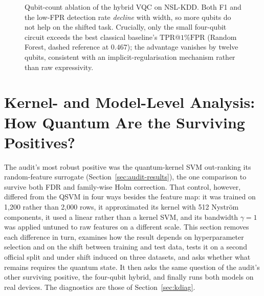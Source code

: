 \documentclass[preprint,11pt]{elsarticle}
\newcommand{\tpr}{\mathrm{TPR}}
\newcommand{\fpr}{\mathrm{FPR}}
\begin{document}
\begin{figure}[t]
\centering
{}
\caption{Qubit-count ablation of the hybrid VQC on NSL-KDD. Both F1 and the low-FPR detection rate
\emph{decline} with width, so more qubits do not help on the shifted task. Crucially, only the small
four-qubit circuit exceeds the best classical baseline's $\tpr$@$1\%\fpr$ (Random Forest, dashed
reference at $0.467$); the advantage vanishes by twelve qubits, consistent with an
implicit-regularisation mechanism rather than raw expressivity.}
\label{fig:ablation}
\end{figure}

\section{Kernel- and Model-Level Analysis: How Quantum Are the Surviving Positives?}\label{sec:kernel}
The audit's most robust positive was the quantum-kernel SVM out-ranking its random-feature surrogate
(Section~\ref{sec:audit-results}), the one comparison to survive both FDR and family-wise Holm
correction. That control, however, differed from the QSVM in four ways besides the feature map: it was
trained on 1{,}200 rather than 2{,}000 rows, it approximated its kernel with 512 Nystr\"om components,
it used a linear rather than a kernel SVM, and its bandwidth $\gamma=1$ was applied untuned to raw
features on a different scale. This section removes each difference in turn, examines how the result depends on hyperparameter
selection and on the shift between training and test data, tests it on a second official split and under
shift induced on three datasets, and asks whether what remains requires the quantum state. It then asks
the same question of the audit's other surviving positive, the four-qubit hybrid, and finally runs both
models on real devices. The diagnostics are those of
Section~\ref{sec:kdiag}.
\end{document}

